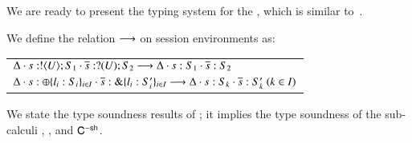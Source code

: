 \smallskip

We are ready to present the typing system for the \HOp,
which is similar to~\cite{tlca07,MostrousY15}.




\smallskip

\begin{definition}%
\label{def:ses_red}
We define the relation $\longrightarrow$ on session environments as:
\\[-2mm]
%
\begin{center}
\begin{tabular}{l}
	$\Delta \cdot s: ! \langle U \rangle ; S_1 \cdot \overline{s}: ? (U) ; S_2 \longrightarrow
	\Delta \cdot s: S_1 \cdot \overline{s}: S_2$\\[1mm]
	$\Delta \cdot s: \oplus \{l_i: S_i\}_{i \in I} \cdot \overline{s}: \& \{l_i: S_i'\}_{i \in I} \longrightarrow \Delta \cdot s: S_k \cdot \overline{s}: S_k' \ (k \in I)$
\end{tabular}
\end{center}
\end{definition}

\smallskip

\noi We state the type soundness results of \HOp; it implies 
the type soundness of the sub-calculi \HO, \sessp, and $\mathsf{C}^{-\mathsf{sh}}$. 

